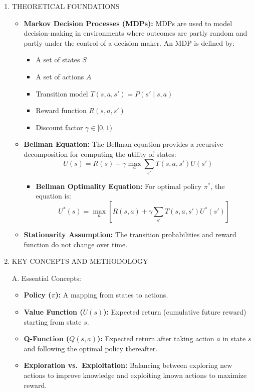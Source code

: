 \documentclass[
  12pt,
]{report}
\providecommand{\tightlist}{%
  \setlength{\itemsep}{0pt}\setlength{\parskip}{0pt}}
\begin{document}
\begin{enumerate}
\def\labelenumi{\arabic{enumi}.}
\item
  THEORETICAL FOUNDATIONS

  \begin{itemize}
  \tightlist
  \item
    \textbf{Markov Decision Processes (MDPs):} MDPs are used to model decision-making in environments where outcomes are partly random and partly under the control of a decision maker. An MDP is defined by:

    \begin{itemize}
    \tightlist
    \item
      A set of states \(S\)
    \item
      A set of actions \(A\)
    \item
      Transition model \(T(s, a, s') = P(s' \mid s, a)\)
    \item
      Reward function \(R(s, a, s')\)
    \item
      Discount factor \(\gamma \in [0, 1)\)
    \end{itemize}
  \item
    \textbf{Bellman Equation:} The Bellman equation provides a recursive decomposition for computing the utility of states:
    \[ U(s) = R(s) + \gamma \max_{a} \sum_{s'} T(s, a, s') U(s') \]

    \begin{itemize}
    \tightlist
    \item
      \textbf{Bellman Optimality Equation:} For optimal policy \(\pi^*\), the equation is:
      \[ U^*(s) = \max_{a} \left[ R(s, a) + \gamma \sum_{s'} T(s, a, s') U^*(s') \right] \]
    \end{itemize}
  \item
    \textbf{Stationarity Assumption:} The transition probabilities and reward function do not change over time.
  \end{itemize}
\item
  KEY CONCEPTS AND METHODOLOGY

  A. Essential Concepts:

  \begin{itemize}
  \tightlist
  \item
    \textbf{Policy (\(\pi\)):} A mapping from states to actions.
  \item
    \textbf{Value Function (\(U(s)\)):} Expected return (cumulative future reward) starting from state \(s\).
  \item
    \textbf{Q-Function (\(Q(s, a)\)):} Expected return after taking action \(a\) in state \(s\) and following the optimal policy thereafter.
  \item
    \textbf{Exploration vs.~Exploitation:} Balancing between exploring new actions to improve knowledge and exploiting known actions to maximize reward.
  \end{itemize}


\end{enumerate}
\end{document}

